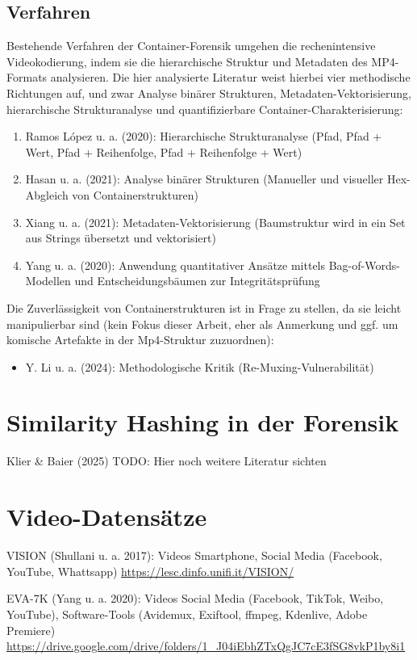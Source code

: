 \subsection{Verfahren}

Bestehende Verfahren der Container-Forensik umgehen die rechenintensive Videokodierung, indem sie die hierarchische Struktur und Metadaten des MP4-Formats analysieren. Die hier analysierte Literatur weist hierbei vier methodische Richtungen auf, und zwar Analyse binärer Strukturen, Metadaten-Vektorisierung, hierarchische Strukturanalyse und quantifizierbare Container-Charakterisierung:

\begin{enumerate}
    \item Ramos López u. a. (2020)\cite{ramos_lopez_digital_2020}: Hierarchische Strukturanalyse (Pfad, Pfad + Wert, Pfad + Reihenfolge, Pfad + Reihenfolge + Wert)
    \item Hasan u. a. (2021)\cite{hasan_forensic_2021}: Analyse binärer Strukturen (Manueller und visueller Hex-Abgleich von Containerstrukturen)
    \item Xiang u. a. (2021)\cite{xiang_forensic_2021}: Metadaten-Vektorisierung (Baumstruktur wird in ein Set aus Strings übersetzt und vektorisiert)
    \item Yang u. a. (2020)\cite{yang_efficient_2020}: Anwendung quantitativer Ansätze mittels Bag-of-Words-Modellen und Entscheidungsbäumen zur Integritätsprüfung
\end{enumerate}


Die Zuverlässigkeit von Containerstrukturen ist in Frage zu stellen, da sie leicht manipulierbar sind (kein Fokus dieser Arbeit, eher als Anmerkung und ggf. um komische Artefakte in der Mp4-Struktur zuzuordnen):

\begin{itemize}
    \item Y. Li u. a. (2024)\cite{li_learning_2024}: Methodologische Kritik (Re-Muxing-Vulnerabilität)
\end{itemize}




\section{Similarity Hashing in der Forensik}

Klier \& Baier (2025)\cite{klier_media_2025}
TODO: Hier noch weitere Literatur sichten


\section{Video-Datensätze}

VISION (Shullani u. a. 2017)\cite{shullani_vision_2017}: Videos Smartphone, Social Media (Facebook, YouTube, Whattsapp) \url{https://lesc.dinfo.unifi.it/VISION/}

EVA-7K (Yang u. a. 2020)\cite{yang_efficient_2020}: Videos Social Media (Facebook, TikTok, Weibo, YouTube), Software-Tools (Avidemux, Exiftool, ffmpeg, Kdenlive, Adobe Premiere) \url{https://drive.google.com/drive/folders/1_J04iEbhZTxQgJC7cE3fSG8vkP1by8i1}